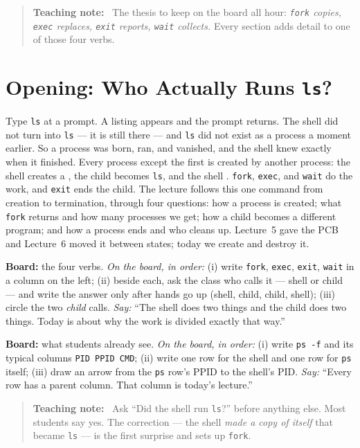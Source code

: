 \documentclass[11pt]{article}
\newenvironment{teachingaside}{\begin{quote}\small\color{primary-gold}\textbf{Teaching note:}\ }{\end{quote}}
\begin{document}
\begin{teachingaside}
The thesis to keep on the board all hour: \emph{\texttt{fork} copies, \texttt{exec} replaces, \texttt{exit} reports, \texttt{wait} collects.} Every section adds detail to one of those four verbs.
\end{teachingaside}

\section{Opening: Who Actually Runs \texttt{ls}?}

Type \texttt{ls} at a prompt. A listing appears and the prompt returns. The shell did not turn into \texttt{ls} --- it is still there --- and \texttt{ls} did not exist as a process a moment earlier. So a process was born, ran, and vanished, and the shell knew exactly when it finished. Every process except the first is created by another process: the shell creates a , the child becomes \texttt{ls}, and the shell . \texttt{fork}, \texttt{exec}, and \texttt{wait} do the work, and \texttt{exit} ends the child. The lecture follows this one command from creation to termination, through four questions: how a process is created; what \texttt{fork} returns and how many processes we get; how a child becomes a different program; and how a process ends and who cleans up. Lecture~5 gave the PCB and Lecture~6 moved it between states; today we create and destroy it.

\textbf{Board:} the four verbs. \emph{On the board, in order:} (i) write \texttt{fork}, \texttt{exec}, \texttt{exit}, \texttt{wait} in a column on the left; (ii) beside each, ask the class who calls it --- shell or child --- and write the answer only after hands go up (shell, child, child, shell); (iii) circle the two \emph{child} calls. \emph{Say:} ``The shell does two things and the child does two things. Today is about why the work is divided exactly that way.''

\textbf{Board:} what students already see. \emph{On the board, in order:} (i) write \texttt{ps -f} and its typical columns \texttt{PID PPID CMD}; (ii) write one row for the shell and one row for \texttt{ps} itself; (iii) draw an arrow from the \texttt{ps} row's PPID to the shell's PID. \emph{Say:} ``Every row has a parent column. That column is today's lecture.''

\begin{teachingaside}
Ask ``Did the shell run \texttt{ls}?'' before anything else. Most students say yes. The correction --- the shell \emph{made a copy of itself} that became \texttt{ls} --- is the first surprise and sets up \texttt{fork}.
\end{teachingaside}
\end{document}
